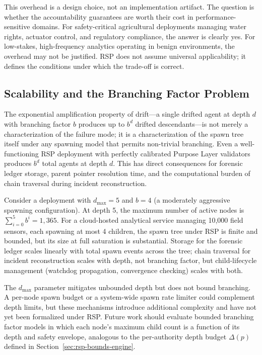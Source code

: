 This overhead is a design choice, not an implementation artifact. The question is whether the accountability guarantees are worth their cost in performance-sensitive domains. For safety-critical agricultural deployments managing water rights, actuator control, and regulatory compliance, the answer is clearly yes. For low-stakes, high-frequency analytics operating in benign environments, the overhead may not be justified. RSP does not assume universal applicability; it defines the conditions under which the trade-off is correct.

\subsection{Scalability and the Branching Factor Problem}
\label{sec:limitations-scalability}

The exponential amplification property of drift---a single drifted agent at depth $d$ with branching factor $b$ produces up to $b^d$ drifted descendants---is not merely a characterization of the failure mode; it is a characterization of the spawn tree itself under any spawning model that permits non-trivial branching. Even a well-functioning RSP deployment with perfectly calibrated Purpose Layer validators produces $b^d$ total agents at depth $d$. This has direct consequences for forensic ledger storage, parent pointer resolution time, and the computational burden of chain traversal during incident reconstruction.

Consider a deployment with $d_{\max} = 5$ and $b = 4$ (a moderately aggressive spawning configuration). At depth 5, the maximum number of active nodes is $\sum_{i=0}^{5} b^i = 1,365$. For a cloud-hosted analytical service managing 10,000 field sensors, each spawning at most 4 children, the spawn tree under RSP is finite and bounded, but its size at full saturation is substantial. Storage for the forensic ledger scales linearly with total spawn events across the tree; chain traversal for incident reconstruction scales with depth, not branching factor, but child-lifecycle management (watchdog propagation, convergence checking) scales with both.

The $d_{\max}$ parameter mitigates unbounded depth but does not bound branching. A per-node spawn budget or a system-wide spawn rate limiter could complement depth limits, but these mechanisms introduce additional complexity and have not yet been formalized under RSP. Future work should evaluate bounded branching factor models in which each node's maximum child count is a function of its depth and safety envelope, analogous to the per-authority depth budget $\Delta(p)$ defined in Section~\ref{sec:rsp-bounds-engine}.

